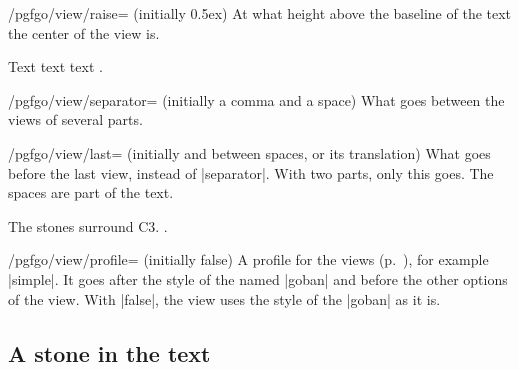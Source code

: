 	\begin{key}{/pgfgo/view/raise= (initially 0.5ex)}
		At what height above the baseline of the text the center of the view is.

		\begin{codeexample}[]
			Text 
			text 
			text .
		\end{codeexample}
	\end{key}

	\begin{key}{/pgfgo/view/separator= (initially a comma and a space)}
		What goes between the views of several parts.
	\end{key}

	\begin{key}{/pgfgo/view/last= (initially and between spaces, or its translation)}
		What goes before the last view, instead of |separator|. With two parts, only this goes. The spaces are part of the text.

		\begin{codeexample}[]
			The stones  surround C3.
			.
		\end{codeexample}
	\end{key}

	\begin{key}{/pgfgo/view/profile= (initially false)}
		A profile for the views (p.~\pageref{subsec:perfiles}), for example |simple|. It goes after the style of the named |goban| and before the other options of the view. With |false|, the view uses the style of the |goban| as it is.

		\begin{codeexample}[]
		\end{codeexample}
	\end{key}

	\subsection{A stone in the text}
	\label{subsec:piedra-texto}

